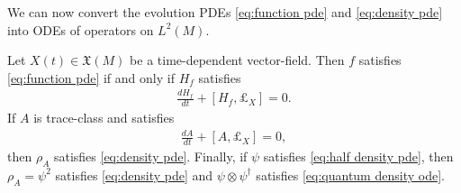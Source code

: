 \documentclass[final,leqno]{siamart}
\newcommand{\pder}[2]{\ensuremath{\frac{ \partial #1}{\partial #2}}}
\newtheorem{example}[theorem]{Example}
\begin{document}
%

We can now convert the evolution PDEs \eqref{eq:function pde} and \eqref{eq:density pde} into ODEs of operators on $L^{2}(M)$.

\begin{theorem} \label{thm:quantize}
	Let $X(t) \in \mathfrak{X}(M)$ be a time-dependent vector-field.
	Then $f$ satisfies \eqref{eq:function pde}
	if and only if $H_{f}$ satisfies
	\begin{align}
		\frac{d H_{f} }{dt} + [ H_{f} , \pounds_{X} ] = 0. \label{eq:quantum observable ode}
	\end{align}
	If $A$ is trace-class and satisfies
	\begin{align}
		\frac{dA}{dt} + [ A , \pounds_{X} ] = 0, \label{eq:quantum density ode}
	\end{align}
	then $\rho_{A}$ satisfies \eqref{eq:density pde}.
	Finally, if $\psi$ satisfies \eqref{eq:half density pde}, then $\rho_{A} = \psi^{2}$ satisfies \eqref{eq:density pde} and $\psi \otimes \psi^{\dagger}$ satisfies \eqref{eq:quantum density ode}.
\end{theorem}
\end{document}
